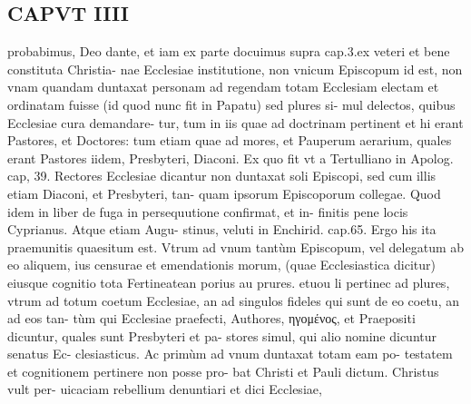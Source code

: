 \documentclass{article}
\begin{document}
\begin{pages}
\section*{CAPVT  IIII }
\marginpar{[ p.241 ]}\pstart probabimus, Deo dante, et iam ex parte docuimus supra cap.3.ex veteri et bene constituta Christia- nae Ecclesiae institutione, non vnicum Episcopum id est, non vnam quandam duntaxat personam ad regendam totam Ecclesiam electam et ordinatam fuisse (id quod nunc fit in Papatu) sed plures si- mul delectos, quibus Ecclesiae cura demandare- tur, tum in iis quae ad doctrinam pertinent et hi erant Pastores, et Doctores: tum etiam quae ad mores, et Pauperum aerarium, quales erant Pastores iidem, Presbyteri, Diaconi. Ex quo fit vt a Tertulliano in Apolog. cap, 39. Rectores Ecclesiae dicantur non duntaxat soli Episcopi, sed cum illis etiam Diaconi, et Presbyteri, tan- quam ipsorum Episcoporum collegae. Quod idem in liber  de fuga in persequutione confirmat, et in- finitis pene locis Cyprianus. Atque etiam Augu- stinus, veluti in Enchirid. cap.65.  \pend\pstart Ergo his ita praemunitis quaesitum est. Vtrum ad vnum tantùm Episcopum, vel delegatum ab eo aliquem, ius censurae et emendationis morum, (quae Ecclesiastica dicitur) eiusque cognitio tota Fertineatean porius au prures. etuou li pertinec ad plures, vtrum ad totum coetum Ecclesiae, an ad singulos fideles qui sunt de eo coetu, an ad eos tan- tùm qui Ecclesiae praefecti, Authores, ηγομένος, et Praepositi dicuntur, quales sunt Presbyteri et pa- stores simul, qui alio nomine dicuntur senatus Ec- clesiasticus.  \pend\pstart Ac primùm ad vnum duntaxat totam eam po- testatem et cognitionem pertinere non posse pro- bat Christi et Pauli dictum. Christus vult per- uicaciam rebellium denuntiari et dici Ecclesiae,  \pend

\end{pages}
\end{document}

